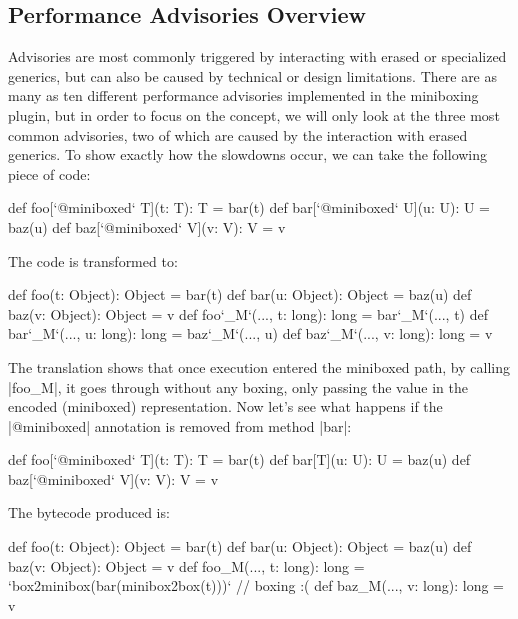 \subsection{Performance Advisories Overview}

Advisories are most commonly triggered by interacting with erased or specialized generics, but can also be caused by technical or design limitations. There are as many as ten different performance advisories implemented in the miniboxing plugin, but in order to focus on the concept, we will only look at the three most common advisories, two of which are caused by the interaction with erased generics. To show exactly how the slowdowns occur, we can take the following piece of code:

\begin{lstlisting-nobreak}
 def foo[`@miniboxed` T](t: T): T = bar(t)
 def bar[`@miniboxed` U](u: U): U = baz(u)
 def baz[`@miniboxed` V](v: V): V = v
\end{lstlisting-nobreak}

The code is transformed to:

\begin{lstlisting-nobreak}
 def foo(t: Object): Object = bar(t)
 def bar(u: Object): Object = baz(u)
 def baz(v: Object): Object = v
 def foo`_M`(..., t: long): long = bar`_M`(..., t)
 def bar`_M`(..., u: long): long = baz`_M`(..., u)
 def baz`_M`(..., v: long): long = v
\end{lstlisting-nobreak}

The translation shows that once execution entered the miniboxed path, by calling |foo_M|, it goes through without any boxing, only passing the value in the encoded (miniboxed) representation. Now let's see what happens if the |@miniboxed| annotation is removed from method |bar|:

\begin{lstlisting-nobreak}
 def foo[`@miniboxed` T](t: T): T = bar(t)
 def bar[T](u: U): U = baz(u)
 def baz[`@miniboxed` V](v: V): V = v
\end{lstlisting-nobreak}

The bytecode produced is:

\begin{lstlisting-nobreak}
 def foo(t: Object): Object = bar(t)
 def bar(u: Object): Object = baz(u)
 def baz(v: Object): Object = v
 def foo_M(..., t: long): long = `box2minibox(bar(minibox2box(t)))` // boxing :(
 def baz_M(..., v: long): long = v
\end{lstlisting-nobreak}

